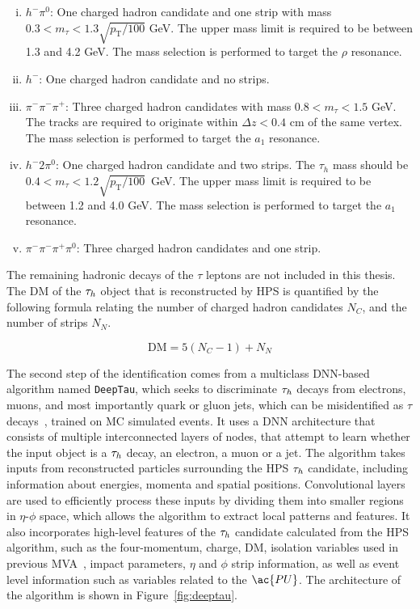\begin{enumerate}[i)]
\item $h^- \pi^0$: One charged hadron candidate and one strip with mass $ 0.3 < m_{\tau} < 1.3 \sqrt{p_{\text{T}}/100}$ GeV. The upper mass limit is required to be between 1.3 and 4.2 GeV. The mass selection is performed to target the $\rho$ resonance.
\item $h^-$: One charged hadron candidate and no strips.
\item $\pi^- \pi^- \pi^+$: Three charged hadron candidates with mass $0.8 < m_{\tau} < 1.5$ GeV. The tracks are required to originate within $\Delta z<0.4$ cm of the same vertex. The mass selection is performed to target the $a_1$ resonance.
\item $h^- 2\pi^0$: One charged hadron candidate and two strips. The $\tau_{h}$ mass should be $0.4 < m_{\tau} < 1.2\sqrt{p_{\text{T}}/100}$~GeV. The upper mass limit is required to be between 1.2 and 4.0 GeV. The mass selection is performed to target the $a_1$ resonance.
\item $\pi^- \pi^- \pi^+ \pi^0$: Three charged hadron candidates and one strip.
\end{enumerate}

The remaining hadronic decays of the $\tau$ leptons are not included in this thesis.
The \ac{DM} of the $\tau_{h}$ object that is reconstructed by \ac{HPS} is quantified by the following formula relating the number of charged hadron candidates $N_C$, and the number of strips $N_N$.

\begin{equation}
\text{DM} = 5(N_{C} - 1) + N_{N}
\end{equation}

The second step of the identification comes from a multiclass \ac{DNN}-based algorithm named \texttt{DeepTau}, which seeks to discriminate $\tau_{h}$ decays from electrons, muons, and most importantly quark or gluon jets, which can be misidentified as $\tau$ decays~\cite{CMS:2022prd}, trained on \ac{MC} simulated events.
It uses a \ac{DNN} architecture that consists of multiple interconnected layers of nodes, that attempt to learn whether the input object is a $\tau_{h}$ decay, an electron, a muon or a jet. 
The algorithm takes inputs from reconstructed particles surrounding the \ac{HPS} $\tau_{h}$ candidate, including information about energies, momenta and spatial positions. 
Convolutional layers are used to efficiently process these inputs by dividing them into smaller regions in $\eta$-$\phi$ space, which allows the algorithm to extract local patterns and features. 
It also incorporates high-level features of the $\tau_{h}$ candidate calculated from the \ac{HPS} algorithm, such as the four-momentum, charge, \ac{DM}, isolation variables used in previous \ac{MVA}~\cite{CMS:2018jrd}, impact parameters, $\eta$ and $\phi$ strip information, as well as event level information such as variables related to the $\ac{PU}$.
The architecture of the algorithm is shown in Figure~\ref{fig:deeptau}. \\

